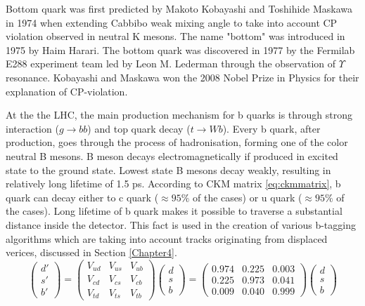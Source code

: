 Bottom quark was first predicted by Makoto Kobayashi and Toshihide Maskawa in 1974 when extending Cabbibo weak mixing angle to take into account CP violation observed in neutral K mesons. \cite{Kobayashi:1973fv} The name "bottom" was introduced in 1975 by Haim Harari. The bottom quark was discovered in 1977 by the Fermilab E288 experiment team led by Leon M. Lederman through the observation of $\Upsilon$ resonance. \cite{PhysRevLett.39.252} Kobayashi and Maskawa won the 2008 Nobel Prize in Physics for their explanation of CP-violation. 
\par At the the LHC, the main production mechanism for b quarks is through strong interaction ($g\rightarrow bb$) and top quark decay ($t\rightarrow Wb$). Every b quark, after production, goes through the process of hadronisation, forming one of the color neutral B mesons. B meson decays electromagnetically if produced in excited state to the ground state. Lowest state B mesons decay weakly, resulting in relatively long lifetime of 1.5 ps. According to CKM matrix \ref{eq:ckmmatrix}, b quark can decay either to c quark ($\approx 95\%$ of the cases) or u quark ($\approx 95\%$ of the cases). Long lifetime of b quark makes it possible to traverse a substantial distance inside the detector. This fact is used in the creation of various b-tagging algorithms which are taking into account tracks originating from displaced verices, discussed in Section \ref{Chapter4}.
\begin{equation} 
\begin{pmatrix} 
d' \\ s' \\ b' 
\end{pmatrix} = 
\begin{pmatrix}
V_{ud} & V_{us} & V_{ub} \\
V_{cd} & V_{cs} & V_{cb} \\
V_{td} & V_{ts} & V_{tb} 
\end{pmatrix} 
\begin{pmatrix} 
d \\ s \\ b 
\end{pmatrix}
= \begin{pmatrix}
0.974 & 0.225 & 0.003 \\
0.225 & 0.973 & 0.041 \\
0.009 & 0.040 & 0.999 
\end{pmatrix} 
\begin{pmatrix} 
d \\ s \\ b 
\end{pmatrix} 
\label{eq:ckmmatrix} 
\end{equation}


